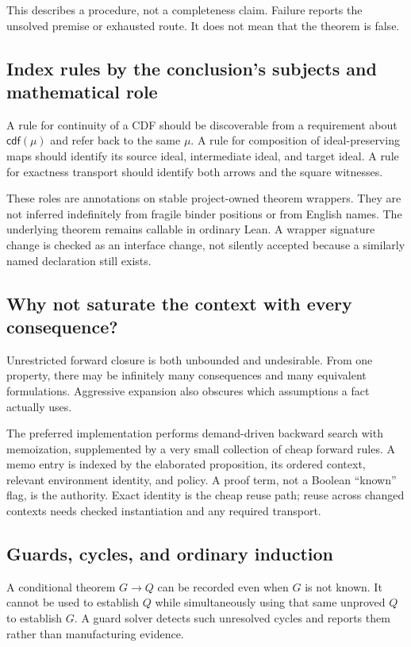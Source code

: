 \documentclass[11pt,a4paper]{article}
\theoremstyle{plain}
\theoremstyle{definition}
\theoremstyle{remark}
\begin{document}
This describes a procedure, not a completeness claim. Failure reports the
unsolved premise or exhausted route. It does not mean that the theorem is false.

\subsection{Index rules by the conclusion's subjects and mathematical role}
A rule for continuity of a CDF should be discoverable from a requirement about
$\mathsf{cdf}(\mu)$ and refer back to the same $\mu$. A rule for composition of
ideal-preserving maps should identify its source ideal, intermediate ideal,
and target ideal. A rule for exactness transport should identify both arrows
and the square witnesses.

These roles are annotations on stable project-owned theorem wrappers. They
are not inferred indefinitely from fragile binder positions or from English
names. The underlying theorem remains callable in ordinary Lean. A wrapper
signature change is checked as an interface change, not silently accepted
because a similarly named declaration still exists.

\subsection{Why not saturate the context with every consequence?}
Unrestricted forward closure is both unbounded and undesirable. From one
property, there may be infinitely many consequences and many equivalent
formulations. Aggressive expansion also obscures which assumptions a fact
actually uses.

The preferred implementation performs demand-driven backward search with
memoization, supplemented by a very small collection of cheap forward rules.
A memo entry is indexed by the elaborated proposition, its ordered context,
relevant environment identity, and policy. A proof term, not a Boolean
``known'' flag, is the authority. Exact identity is the cheap reuse path;
reuse across changed contexts needs checked instantiation and any required
transport.

\subsection{Guards, cycles, and ordinary induction}
A conditional theorem $G\to Q$ can be recorded even when $G$ is not known.
It cannot be used to establish $Q$ while simultaneously using that same
unproved $Q$ to establish $G$. A guard solver detects such unresolved cycles
and reports them rather than manufacturing evidence.
\end{document}
